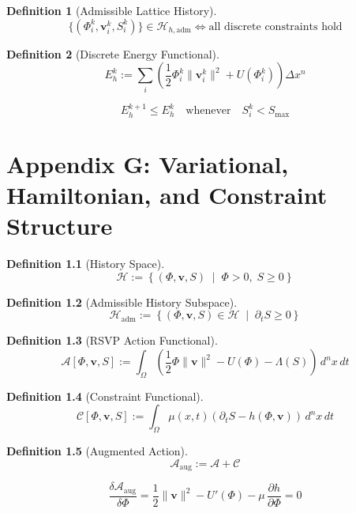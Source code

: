 \documentclass[11pt,oneside]{book}
\newtheorem{definition}{Definition}[chapter]
\begin{document}
\begin{definition}[Admissible Lattice History]
\[
\{(\Phi_i^k,\mathbf{v}_i^k,S_i^k)\}
\in \mathcal{H}_{h,\mathrm{adm}}
\iff
\text{all discrete constraints hold}
\]
\end{definition}

\begin{definition}[Discrete Energy Functional]
\[
E_h^k
:= \sum_i
\left(
\frac{1}{2}\Phi_i^k \|\mathbf{v}_i^k\|^2
+ U(\Phi_i^k)
\right)\Delta x^n
\]
\end{definition}

\begin{axiom}
\[
E_h^{k+1} \le E_h^k
\quad\text{whenever}\quad
S_i^k < S_{\max}
\]
\end{axiom}

\chapter{Appendix G: Variational, Hamiltonian, and Constraint Structure}

\begin{definition}[History Space]
\[
\mathcal{H}
:= \left\{
(\Phi,\mathbf{v},S) \;\middle|\;
\Phi>0,\; S\ge 0
\right\}
\]
\end{definition}

\begin{definition}[Admissible History Subspace]
\[
\mathcal{H}_{\mathrm{adm}}
:= \left\{
(\Phi,\mathbf{v},S)\in\mathcal{H}
\;\middle|\;
\partial_t S \ge 0
\right\}
\]
\end{definition}

\begin{definition}[RSVP Action Functional]
\[
\mathcal{A}[\Phi,\mathbf{v},S]
:= \int_{\Omega}
\left(
\frac{1}{2}\Phi \|\mathbf{v}\|^2
- U(\Phi)
- \Lambda(S)
\right)
\, d^n x\, dt
\]
\end{definition}

\begin{definition}[Constraint Functional]
\[
\mathcal{C}[\Phi,\mathbf{v},S]
:= \int_{\Omega}
\mu(x,t)
\left(
\partial_t S - h(\Phi,\mathbf{v})
\right)
\, d^n x\, dt
\]
\end{definition}

\begin{definition}[Augmented Action]
\[
\mathcal{A}_{\mathrm{aug}}
:= \mathcal{A} + \mathcal{C}
\]
\end{definition}

\begin{variation}
\[
\frac{\delta \mathcal{A}_{\mathrm{aug}}}{\delta \Phi}
=
\frac{1}{2}\|\mathbf{v}\|^2
- U'(\Phi)
- \mu\,\frac{\partial h}{\partial \Phi}
= 0
\]
\end{variation}
\end{document}
